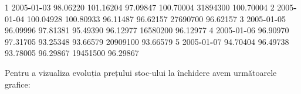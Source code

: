 \documentclass[]{article}
\newenvironment{Shaded}{\begin{snugshade}}{\end{snugshade}}
\newcommand{\DecValTok}[1]{\textcolor[rgb]{0.00,0.00,0.81}{#1}}
\newcommand{\FloatTok}[1]{\textcolor[rgb]{0.00,0.00,0.81}{#1}}
\newcommand{\OperatorTok}[1]{\textcolor[rgb]{0.81,0.36,0.00}{\textbf{#1}}}
\begin{document}
\begin{Shaded}
\begin{Highlighting}[]
\DecValTok{1} \DecValTok{2005}\OperatorTok{-}\DecValTok{01}\OperatorTok{-}\DecValTok{03}  \FloatTok{98.06220} \FloatTok{101.16204} \FloatTok{97.09847} \FloatTok{100.70004} \DecValTok{31894300} \FloatTok{100.70004}
\DecValTok{2} \DecValTok{2005}\OperatorTok{-}\DecValTok{01}\OperatorTok{-}\DecValTok{04} \FloatTok{100.04928} \FloatTok{100.80933} \FloatTok{96.11487}  \FloatTok{96.62157} \DecValTok{27690700}  \FloatTok{96.62157}
\DecValTok{3} \DecValTok{2005}\OperatorTok{-}\DecValTok{01}\OperatorTok{-}\DecValTok{05}  \FloatTok{96.09996}  \FloatTok{97.81381} \FloatTok{95.49390}  \FloatTok{96.12977} \DecValTok{16580200}  \FloatTok{96.12977}
\DecValTok{4} \DecValTok{2005}\OperatorTok{-}\DecValTok{01}\OperatorTok{-}\DecValTok{06}  \FloatTok{96.90970}  \FloatTok{97.31705} \FloatTok{93.25348}  \FloatTok{93.66579} \DecValTok{20909100}  \FloatTok{93.66579}
\DecValTok{5} \DecValTok{2005}\OperatorTok{-}\DecValTok{01}\OperatorTok{-}\DecValTok{07}  \FloatTok{94.70404}  \FloatTok{96.49738} \FloatTok{93.78005}  \FloatTok{96.29867} \DecValTok{19451500}  \FloatTok{96.29867}
\end{Highlighting}
\end{Shaded}

Pentru a vizualiza evoluția prețului stoc-ului la închidere avem
următoarele grafice:
\end{document}
